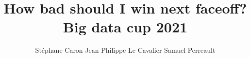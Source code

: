 \usepackage{bbm}

\usepackage{fancyhdr}

\pagestyle{fancy}
\fancyhf{}
\renewcommand{\headrulewidth}{0pt} %
\rfoot{\thepage}

\usepackage[margin=1in]{geometry}

\usepackage{multicol}

\usepackage{hyperref}
\usepackage{xcolor}


\title{How bad should I win next faceoff?\\ {\normalsize Big data cup 2021}}


\author{
Stéphane Caron \qquad
Jean-Philippe Le Cavalier \qquad
Samuel Perreault
}

